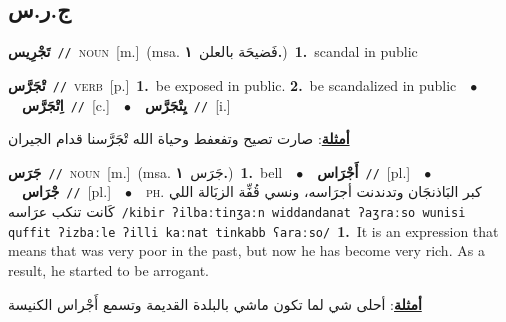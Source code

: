 \documentclass[10pt,a4paper,twoside]{article} %
\begin{document}
\begin{multicols}{2}
\vspace{-3mm}
\subsection*{\color{blue}\foreignlanguage{arabic}{ج.ر.س}\color{blue}{}} 

{\setlength\topsep{0pt}\textbf{\foreignlanguage{arabic}{تَجْرِيس}}\ {\color{gray}\texttt{//}\color{black}}\ \textsc{noun}\ [m.]\ \color{gray}(msa. \foreignlanguage{arabic}{فَضيحَة بالعلن}~\foreignlanguage{arabic}{\textbf{١.}})\color{black}\ \textbf{1.}~scandal in public\ } \vspace{2mm}

{\setlength\topsep{0pt}\textbf{\foreignlanguage{arabic}{تْجَرَّس}}\ {\color{gray}\texttt{//}\color{black}}\ \textsc{verb}\ [p.]\ \textbf{1.}~be exposed in public.  \textbf{2.}~be scandalized in public\ \ $\bullet$\ \ \setlength\topsep{0pt}\textbf{\foreignlanguage{arabic}{اِتْجَرَّس}}\ {\color{gray}\texttt{//}\color{black}}\ [c.]\ \ $\bullet$\ \ \setlength\topsep{0pt}\textbf{\foreignlanguage{arabic}{يِتْجَرَّس}}\ {\color{gray}\texttt{//}\color{black}}\ [i.]\  \begin{flushright}\color{gray}\foreignlanguage{arabic}{\textbf{\underline{\foreignlanguage{arabic}{أمثلة}}}: صارت تصيح وتفعفط وحياة الله تْجَرَّسنا قدام الجيران}\end{flushright}\color{black}} \vspace{2mm}

{\setlength\topsep{0pt}\textbf{\foreignlanguage{arabic}{جَرَس}}\ {\color{gray}\texttt{//}\color{black}}\ \textsc{noun}\ [m.]\ \color{gray}(msa. \foreignlanguage{arabic}{جَرَس}~\foreignlanguage{arabic}{\textbf{١.}})\color{black}\ \textbf{1.}~bell\ \ $\bullet$\ \ \setlength\topsep{0pt}\textbf{\foreignlanguage{arabic}{أَجْرَاس}}\ {\color{gray}\texttt{//}\color{black}}\ [pl.]\ \ $\bullet$\ \ \setlength\topsep{0pt}\textbf{\foreignlanguage{arabic}{جْرَاس}}\ {\color{gray}\texttt{//}\color{black}}\ [pl.]\ \ $\bullet$\ \ \textsc{ph.} \color{gray} \foreignlanguage{arabic}{كبر البَاذنجَان وتدندنت أجرَاسه، ونسي قُفِّة الزبَالة اللي كَانت تنكب عرَاسه}\color{black}\ {\color{gray}\texttt{/{\sffamily kibir ʔilbaːtinʒaːn widdandanat ʔaʒraːso wunisi quffit ʔizbaːle ʔilli kaːnat tinkabb ʕaraːso}/}\color{black}}\ \textbf{1.}~It is an expression that means that was very poor in the past, but now he has become very rich. As a result, he started to be arrogant.\  \begin{flushright}\color{gray}\foreignlanguage{arabic}{\textbf{\underline{\foreignlanguage{arabic}{أمثلة}}}: أحلى شي لما تكون ماشي بالبلدة القديمة وتسمع أَجْراس الكنيسة}\end{flushright}\color{black}} \vspace{2mm}


\end{multicols}
\end{document}
